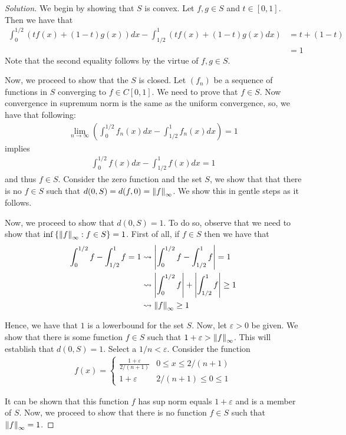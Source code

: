 \horz
\begin{proof}[Solution]
   We begin by showing that $S$ is convex. Let $f, g \in S$ and $t\in [0,1]$. Then we have that 
    \begin{align*}
	\int_{0}^{1/2} \left( t f\left( x \right) + \left( 1-t \right) g\left( x \right)\right) dx - \int_{1/2}^{1} \left( t f\left( x \right) + \left( 1-t \right) g\left( x \right) dx  \right) &= t + (1-t) \\
	&= 1
    \end{align*}
    Note that the second equality follows by the virtue of $f,g \in S$.

    Now, we proceed to show that the $S$ is closed. Let $\left( f_{n} \right) $ be a sequence of functions in $S$ converging to $f \in C\left[ 0,1 \right]$. We need to prove that $f \in S$. Now convergence in supremum norm is the same as the uniform convergence, so, we have that following:
    \begin{align*}
	\lim_{n\to \infty}\left( \int_{0}^{1/2} f_{n}\left( x \right) dx - \int_{1/2}^{1} f_{n} \left( x \right) dx \right) =1
    \end{align*}
    implies 
    \begin{align*}
\int_{0}^{1/2} f\left( x \right) dx - \int_{1/2}^{1} f \left( x \right) dx =1 
\end{align*}
and thus $f \in S$.
Consider the zero function and the set $S$, we show that that there is no $f \in S$ such that $d (0,S) = d(f,0)=\left\lVert f \right\rVert_{\infty}$. We show this in gentle steps as it follows.

Now, we proceed to show that $d\left( 0,S \right) = 1$. To do so, observe that we need to show that $\inf \left\{ \left\lVert f \right\rVert _{\infty} : f \in S \right\} = 1$. First of all, if $f\in S$ then we have that 
\begin{align*}
    \int_{0}^{1/2} f - \int_{1/2}^{1} f =1 & \leadsto \left\lvert \int_{0}^{1/2} f - \int_{1/2}^{1} f  \right\rvert =1  \\
&\leadsto  \left\lvert \int_{0}^{1/2} f \right\rvert +\left\lvert  \int_{1/2}^{1} f  \right\rvert \ge 1  \\
&\leadsto \left\lVert f \right\rVert_{\infty} \ge 1
\end{align*}

Hence, we have that $1$ is a lowerbound for the set $S$. Now, let $\varepsilon > 0$ be given. We show that there is some function $f \in S$ such that $1 + \varepsilon > \left\lVert f \right\rVert_{\infty}$. This will establish that $d\left( 0,S \right) = 1$. Select a $1/n < \varepsilon$.
Consider the function
\begin{align*}
    f(x) = 
    \begin{cases}
	\frac{1+\varepsilon}{ 2/ (n+1)} & 0 \le x \le 2/(n+1) \\
	1+\varepsilon & 2/(n+1) \le 0 \le 1
    \end{cases}
\end{align*}

It can be shown that this function $f$ has sup norm equals $1+\varepsilon$ and is a member of $S$.
Now, we proceed to show  that there is no function $f \in S$ such that $\left\lVert f \right\rVert_{\infty} = 1$.

\end{proof}
